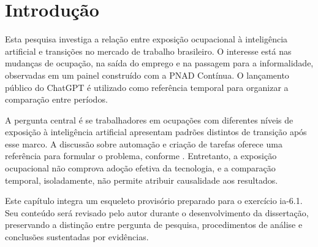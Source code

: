 \section{Introdução}
\label{sec:introducao}

Esta pesquisa investiga a relação entre exposição ocupacional à inteligência artificial e transições no mercado de trabalho brasileiro. O interesse está nas mudanças de ocupação, na saída do emprego e na passagem para a informalidade, observadas em um painel construído com a PNAD Contínua. O lançamento público do ChatGPT é utilizado como referência temporal para organizar a comparação entre períodos.

A pergunta central é se trabalhadores em ocupações com diferentes níveis de exposição à inteligência artificial apresentam padrões distintos de transição após esse marco. A discussão sobre automação e criação de tarefas oferece uma referência para formular o problema, conforme . Entretanto, a exposição ocupacional não comprova adoção efetiva da tecnologia, e a comparação temporal, isoladamente, não permite atribuir causalidade aos resultados.

Este capítulo integra um esqueleto provisório preparado para o exercício ia-6.1. Seu conteúdo será revisado pelo autor durante o desenvolvimento da dissertação, preservando a distinção entre pergunta de pesquisa, procedimentos de análise e conclusões sustentadas por evidências.